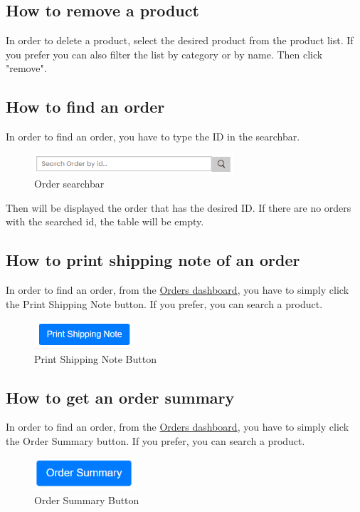 \subsection{How to remove a product}\label{_removeProduct}
In order to delete a product, select the desired product from the product list. If you prefer you can also filter the list by category or by name. Then click "remove".

\subsection{How to find an order}\label{_findOrder}
In order to find an order, you have to type the ID in the searchbar.
\begin{figure}[H]
    \centering
    \includegraphics[width=20em]{res/images/venditore/ordersearchbar.png}
    \caption{Order searchbar}
\end{figure}
Then will be displayed the order that has the desired ID. If there are no orders with the searched id, the table will be empty.

\subsection{How to print shipping note of an order}\label{_shippingNote}
In order to find an order, from the \hyperref[_ordermanagement]{Orders dashboard}, you have to simply click the Print Shipping Note button. If you prefer, you can search a product.
\begin{figure}[H]
    \centering
    \includegraphics[width=10em]{res/images/venditore/printshippingnotebutton.png}
    \caption{Print Shipping Note Button}
\end{figure}

\subsection{How to get an order summary}\label{_orderSummary}
In order to find an order, from the \hyperref[_ordermanagement]{Orders dashboard}, you have to simply click the Order Summary button. If you prefer, you can search a product.
\begin{figure}[H]
    \centering
    \includegraphics[width=10em]{res/images/venditore/ordersummarybutton.png}
    \caption{Order Summary Button}
\end{figure}

